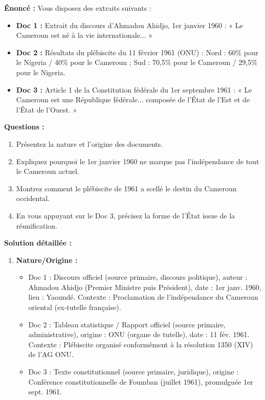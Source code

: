 \documentclass[11pt]{article}
\begin{document}
\begin{exoresolu}
\textbf{Énoncé :} Vous disposez des extraits suivants :
\begin{itemize}
    \item \textbf{Doc 1 :} Extrait du discours d'Ahmadou Ahidjo, 1er janvier 1960 : « Le Cameroun est né à la vie internationale... »
    \item \textbf{Doc 2 :} Résultats du plébiscite du 11 février 1961 (ONU) : Nord : 60\% pour le Nigeria / 40\% pour le Cameroun ; Sud : 70,5\% pour le Cameroun / 29,5\% pour le Nigeria.
    \item \textbf{Doc 3 :} Article 1 de la Constitution fédérale du 1er septembre 1961 : « Le Cameroun est une République fédérale... composée de l'État de l'Est et de l'État de l'Ouest. »
\end{itemize}
\textbf{Questions :}
\begin{enumerate}
    \item Présentez la nature et l'origine des documents.
    \item Expliquez pourquoi le 1er janvier 1960 ne marque pas l'indépendance de tout le Cameroun actuel.
    \item Montrez comment le plébiscite de 1961 a scellé le destin du Cameroun occidental.
    \item En vous appuyant sur le Doc 3, précisez la forme de l'État issue de la réunification.
\end{enumerate}
\tcblower
\textbf{Solution détaillée :}
\begin{enumerate}
    \item \textbf{Nature/Origine :}
    \begin{itemize}
        \item Doc 1 : Discours officiel (source primaire, discours politique), auteur : Ahmadou Ahidjo (Premier Ministre puis Président), date : 1er janv. 1960, lieu : Yaoundé. Contexte : Proclamation de l'indépendance du Cameroun oriental (ex-tutelle française).
        \item Doc 2 : Tableau statistique / Rapport officiel (source primaire, administrative), origine : ONU (organe de tutelle), date : 11 fév. 1961. Contexte : Plébiscite organisé conformément à la résolution 1350 (XIV) de l'AG ONU.
        \item Doc 3 : Texte constitutionnel (source primaire, juridique), origine : Conférence constitutionnelle de Foumban (juillet 1961), promulguée 1er sept. 1961.

\end{itemize}
\end{enumerate}
\end{exoresolu}
\end{document}
